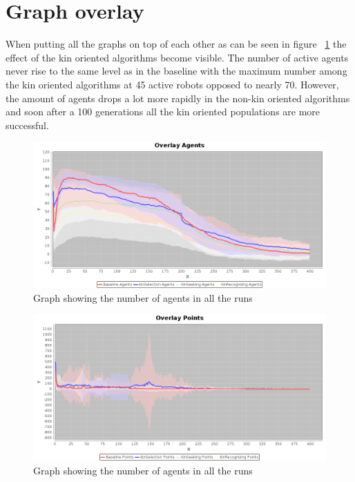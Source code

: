 \documentclass[a4paper]{book}
\begin{document}
\section{Graph overlay}

When putting all the graphs on top of each other as can be seen in figure ~\ref{fig:agents_overlay} the effect of the kin oriented algorithms become visible. 
The number of active agents never rise to the same level as in the baseline with the maximum number among the kin oriented algorithms at 45 active robots opposed to nearly 70.
However, the amount of agents drops a lot more rapidly in the non-kin oriented algorithms and soon after a 100 generations all the kin oriented populations are more successful. 


\begin{figure}
\includegraphics[width=\textwidth]{expr2/overlay_agents.png}
    \caption{Graph showing the number of agents in all the runs}
\label{fig:agents_overlay}
\end{figure}


\begin{figure}
\includegraphics[width=\textwidth]{expr2/overlay_points.png}
    \caption{Graph showing the number of agents in all the runs}
\label{fig:points_overlay}
\end{figure}
\end{document}

